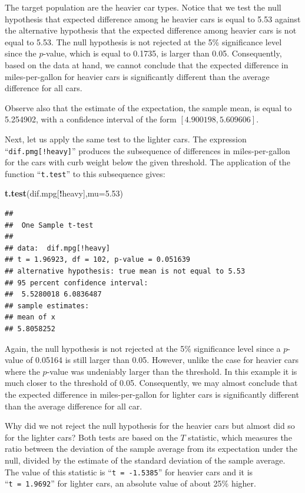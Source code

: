 \documentclass[]{krantz}
\makeatletter
\newenvironment{Shaded}{\begin{snugshade}}{\end{snugshade}}
\newcommand{\KeywordTok}[1]{\textcolor[rgb]{0.13,0.29,0.53}{\textbf{#1}}}
\newcommand{\DataTypeTok}[1]{\textcolor[rgb]{0.13,0.29,0.53}{#1}}
\newcommand{\FloatTok}[1]{\textcolor[rgb]{0.00,0.00,0.81}{#1}}
\newcommand{\OperatorTok}[1]{\textcolor[rgb]{0.81,0.36,0.00}{\textbf{#1}}}
\newcommand{\NormalTok}[1]{#1}
\newenvironment{kframe}{%
\medskip{}
\setlength{\fboxsep}{.8em}
 \def\at@end@of@kframe{}%
 \ifinner\ifhmode%
  \def\at@end@of@kframe{\end{minipage}}%
  \begin{minipage}{\columnwidth}%
 \fi\fi%
 \def\FrameCommand##1{\hskip\@totalleftmargin \hskip-\fboxsep
 \colorbox{shadecolor}{##1}\hskip-\fboxsep
     \hskip-\linewidth \hskip-\@totalleftmargin \hskip\columnwidth}%
 \MakeFramed {\advance\hsize-\width
   \@totalleftmargin\z@ \linewidth\hsize
   \@setminipage}}%
 {\par\unskip\endMakeFramed%
 \at@end@of@kframe}
\renewenvironment{Shaded}{\begin{kframe}}{\end{kframe}}
\theoremstyle{definition}
\theoremstyle{definition}
\theoremstyle{definition}
\theoremstyle{remark}
\makeatother
\begin{document}
The target population are the heavier car types. Notice that we test the
null hypothesis that expected difference among he heavier cars is equal
to 5.53 against the alternative hypothesis that the expected difference
among heavier cars is not equal to 5.53. The null hypothesis is not
rejected at the 5\% significance level since the \(p\)-value, which is
equal to 0.1735, is larger than 0.05. Consequently, based on the data at
hand, we cannot conclude that the expected difference in
miles-per-gallon for heavier cars is significantly different than the
average difference for all cars.

Observe also that the estimate of the expectation, the sample mean, is
equal to 5.254902, with a confidence interval of the form
\([4.900198, 5.609606]\).

Next, let us apply the same test to the lighter cars. The expression
``\texttt{dif.pmg{[}!heavy{]}}'' produces the subsequence of differences
in miles-per-gallon for the cars with curb weight below the given
threshold. The application of the function ``\texttt{t.test}'' to this
subsequence gives:

\begin{Shaded}
\begin{Highlighting}[]
\KeywordTok{t.test}\NormalTok{(dif.mpg[}\OperatorTok{!}\NormalTok{heavy],}\DataTypeTok{mu=}\FloatTok{5.53}\NormalTok{)}
\end{Highlighting}
\end{Shaded}

\begin{verbatim}
## 
##  One Sample t-test
## 
## data:  dif.mpg[!heavy]
## t = 1.96923, df = 102, p-value = 0.051639
## alternative hypothesis: true mean is not equal to 5.53
## 95 percent confidence interval:
##  5.5280018 6.0836487
## sample estimates:
## mean of x 
## 5.8058252
\end{verbatim}

Again, the null hypothesis is not rejected at the 5\% significance level
since a \(p\)-value of 0.05164 is still larger than 0.05. However,
unlike the case for heavier cars where the \(p\)-value was undeniably
larger than the threshold. In this example it is much closer to the
threshold of 0.05. Consequently, we may almost conclude that the
expected difference in miles-per-gallon for lighter cars is
significantly different than the average difference for all car.

Why did we not reject the null hypothesis for the heavier cars but
almost did so for the lighter cars? Both tests are based on the \(T\)
statistic, which measures the ratio between the deviation of the sample
average from its expectation under the null, divided by the estimate of
the standard deviation of the sample average. The value of this
statistic is ``\texttt{t\ =\ -1.5385}'' for heavier cars and it is
``\texttt{t\ =\ 1.9692}'' for lighter cars, an absolute value of about
25\% higher.
\end{document}
